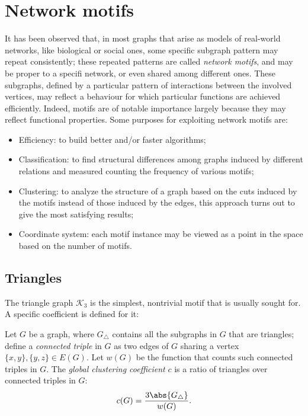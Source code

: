 \chapter{Network motifs}

It has been observed that, in most graphs that arise as models of real-world networks, like biological or social ones, some specific subgraph pattern may repeat consistently; these repeated patterns are called \emph{network motifs}, and  may be proper to a specifi network, or even shared among different ones. These subgraphs, defined by a particular pattern of interactions between the involved vertices, may reflect a behaviour for which particular functions are achieved efficiently. Indeed, motifs are of notable importance largely because they may reflect functional properties. Some purposes for exploiting network motifs are:
   \begin{itemize}
       \item Efficiency: to build better and/or faster algorithms;
       \item Classification: to find structural differences among graphs induced by different relations and measured counting the frequency of various motifs;
       \item Clustering: to analyze the structure of a graph based on the cuts induced by the motifs instead of those induced by the edges, this approach turns out to give the most satisfying results;
       \item Coordinate system: each motif instance may be viewed as a point in the space based on the number of motifs.
   \end{itemize}

   
\section{Triangles}

The triangle graph $\mathcal{K}_3$ is the simplest, nontrivial motif that is usually sought for. A specific coefficient is defined for it:
\begin{definition}
    Let $G$ be a graph, where $G_\triangle$ contains all the subgraphs in $G$ that are triangles; define a \emph{connected triple} in $G$ as two edges of $G$ sharing a vertex $\{x, y\}, \{y, z\} \in E(G)$. Let $w(G)$ be the function that counts such connected triples in $G$. The \emph{global clustering coefficient} $c$ is a ratio of triangles over connected triples in $G$:
    \begin{equation}\label{eq:clustering-coefficient}
        c(G) = \frac{3 \abs{G_\triangle}}{w(G)}.
    \end{equation}
\end{definition}

